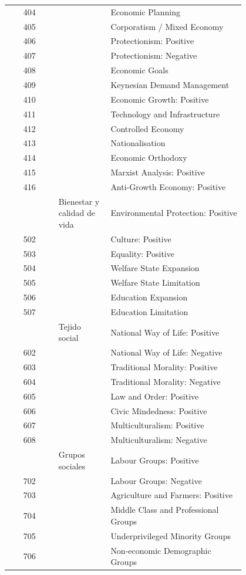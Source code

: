 {\begin{longtable}{@{}c >{\raggedright\arraybackslash}p{0.22\linewidth} >{\raggedright\arraybackslash}p{0.58\linewidth}@{}}
404 &  & Economic Planning \\
405 &  & Corporatism / Mixed Economy \\
406 &  & Protectionism: Positive \\
407 &  & Protectionism: Negative \\
408 &  & Economic Goals \\
409 &  & Keynesian Demand Management \\
410 &  & Economic Growth: Positive \\
411 &  & Technology and Infrastructure \\
412 &  & Controlled Economy \\
413 &  & Nationalisation \\
414 &  & Economic Orthodoxy \\
415 &  & Marxist Analysis: Positive \\
416 &  & Anti-Growth Economy: Positive \\
\addlinespace
501 & Bienestar y calidad de vida & Environmental Protection: Positive \\
502 &  & Culture: Positive \\
503 &  & Equality: Positive \\
504 &  & Welfare State Expansion \\
505 &  & Welfare State Limitation \\
506 &  & Education Expansion \\
507 &  & Education Limitation \\
\addlinespace
601 & Tejido social & National Way of Life: Positive \\
602 &  & National Way of Life: Negative \\
603 &  & Traditional Morality: Positive \\
604 &  & Traditional Morality: Negative \\
605 &  & Law and Order: Positive \\
606 &  & Civic Mindedness: Positive \\
607 &  & Multiculturalism: Positive \\
608 &  & Multiculturalism: Negative \\
\addlinespace
701 & Grupos sociales & Labour Groups: Positive \\
702 &  & Labour Groups: Negative \\
703 &  & Agriculture and Farmers: Positive \\
704 &  & Middle Class and Professional Groups \\
705 &  & Underprivileged Minority Groups \\
706 &  & Non-economic Demographic Groups \\
\end{longtable}
}


